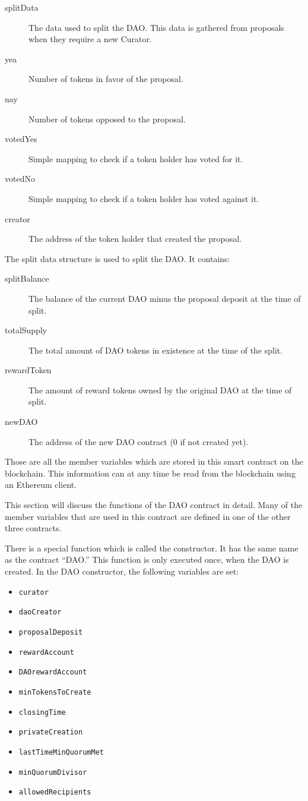 \documentclass[9pt,oneside]{amsart}
\begin{document}
\begin{multicols}{2}
\begin{description}
 \item[splitData] The data used to split the DAO. This data is gathered from proposals when they require a new Curator.
 \item[yea] Number of tokens in favor of the proposal.
 \item[nay] Number of tokens opposed to the proposal.
 \item[votedYes] Simple mapping to check if a token holder has voted for it.
 \item[votedNo] Simple mapping to check if a token holder has voted against it.
 \item[creator] The address of the token holder that created the proposal.
\end{description}

The split data structure is used to split the DAO. It contains:
\begin{description}
 \item[splitBalance] The balance of the current DAO minus the proposal deposit at the time of split.
 \item[totalSupply] The total amount of DAO tokens in existence at the time of the split.
 \item[rewardToken] The amount of reward tokens owned by the original DAO at the time of split.
 \item[newDAO] The address of the new DAO contract ($0$ if not created yet).
\end{description}

Those are all the member variables which are stored in this smart contract on the blockchain. This information can at any time be read from the blockchain using an Ethereum client.

This section will discuss the functions of the DAO contract in detail. Many of the member variables that are used in this contract are defined in one of the other three contracts. 

There is a special function which is called the constructor. It has the same name as the contract ``DAO.'' This function is only executed once, when the DAO is created.
In the DAO constructor, the following variables are set:
\begin{itemize}
 \item \verb|curator|
 \item \verb|daoCreator|
 \item \verb|proposalDeposit|
 \item \verb|rewardAccount|
 \item \verb|DAOrewardAccount|
 \item \verb|minTokensToCreate|
 \item \verb|closingTime|
 \item \verb|privateCreation|
 \item \verb|lastTimeMinQuorumMet|
 \item \verb|minQuorumDivisor|
 \item \verb|allowedRecipients|
\end{itemize}


\end{multicols}
\end{document}

